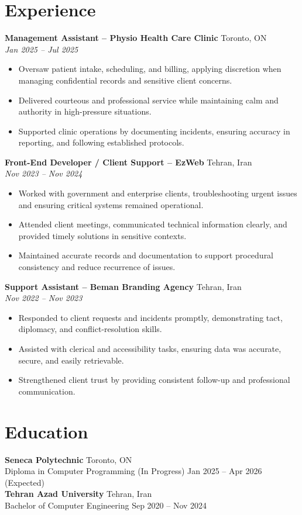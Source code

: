 \documentclass[letterpaper,10pt]{article}
\begin{document}
\section*{Experience}
\textbf{Management Assistant – Physio Health Care Clinic} \hfill Toronto, ON \\
\textit{Jan 2025 – Jul 2025}
\begin{itemize}[leftmargin=*]
  \item Oversaw patient intake, scheduling, and billing, applying discretion when managing confidential records and sensitive client concerns.
  \item Delivered courteous and professional service while maintaining calm and authority in high-pressure situations.
  \item Supported clinic operations by documenting incidents, ensuring accuracy in reporting, and following established protocols.
\end{itemize}

\textbf{Front-End Developer / Client Support – EzWeb} \hfill Tehran, Iran \\
\textit{Nov 2023 – Nov 2024}
\begin{itemize}[leftmargin=*]
  \item Worked with government and enterprise clients, troubleshooting urgent issues and ensuring critical systems remained operational.
  \item Attended client meetings, communicated technical information clearly, and provided timely solutions in sensitive contexts.
  \item Maintained accurate records and documentation to support procedural consistency and reduce recurrence of issues.
\end{itemize}

\textbf{Support Assistant – Beman Branding Agency} \hfill Tehran, Iran \\
\textit{Nov 2022 – Nov 2023}
\begin{itemize}[leftmargin=*]
  \item Responded to client requests and incidents promptly, demonstrating tact, diplomacy, and conflict-resolution skills.
  \item Assisted with clerical and accessibility tasks, ensuring data was accurate, secure, and easily retrievable.
  \item Strengthened client trust by providing consistent follow-up and professional communication.
\end{itemize}

\section*{Education}
\textbf{Seneca Polytechnic} \hfill Toronto, ON \\
Diploma in Computer Programming (In Progress) \hfill Jan 2025 -- Apr 2026 (Expected) \\

\textbf{Tehran Azad University} \hfill Tehran, Iran \\
Bachelor of Computer Engineering \hfill Sep 2020 -- Nov 2024 \\
\end{document}
